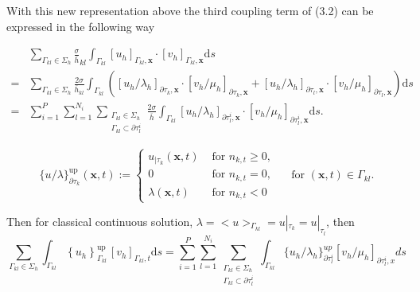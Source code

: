     With this new representation above the third coupling term of (3.2) can be expressed in the following way
    
$$\begin{aligned}
&\sum_{\Gamma_{k l} \in \Sigma_{h}} \frac{\sigma}{\bar{h}}_{k l} \int_{\Gamma_{k l}}\left[u_{h}\right]_{\Gamma_{k l}, \boldsymbol{x}} \cdot\left[v_{h}\right]_{\Gamma_{k l}, \boldsymbol{x}} \mathrm{d} s \\
=&\sum_{\Gamma_{k l} \in \Sigma_{h}} \frac{2 \sigma}{\bar{h}_{k l}} \int_{\Gamma_{k l}}\left( {\left[u_{h} / \lambda_{h}\right]_{\partial \tau_{k}, \boldsymbol{x}} \cdot\left[v_{h} / \mu_{h}\right]_{\partial \tau_{k}, \boldsymbol{x}} }+\left[u_{h} / \lambda_{h}\right]_{\partial \tau_{l}, \boldsymbol{x}} \cdot\left[v_{h} / \mu_{h}\right]_{\partial \tau_{l}, \boldsymbol{x}}\right) \mathrm{d} s \\
=&\sum_{i=1}^{P} \sum_{l=1}^{N_{i}} \sum_{\substack{\Gamma_{k l} \in \Sigma_{h} \\
\Gamma_{k l} \subset \partial \tau_{l}^{i}}} \frac{2 \sigma}{\overline{h}} \int_{\Gamma_{k l}}\left[u_{h} / \lambda_{h}\right]_{\partial \tau_{l}^{i}, \boldsymbol{x}} \cdot\left[v_{h} / \mu_{h}\right]_{\partial \tau_{l}^{i}, \boldsymbol{x}} \mathrm{d} s .
\end{aligned}$$

\begin{definition}
    $$\{u / \lambda\}_{\partial \tau_{k}}^{\operatorname{up}}(\boldsymbol{x}, t):=\left\{\begin{array}{ll}
        u_{\mid \tau_{k}}(\boldsymbol{x}, t) & \text { for } n_{k, t} \geq 0, \\
        0 & \text { for } n_{k, t}=0, \\
        \lambda(\boldsymbol{x}, t) & \text { for } n_{k, t}<0
        \end{array} \quad \text { for }(\boldsymbol{x}, t) \in \Gamma_{k l} .\right.$$
\end{definition}

Then for classical continuous solution, $\lambda=<u>_{\Gamma_{kl}}=u|_{\tau_k}=u|_{\tau_l}$, then 
$$\sum_{\Gamma_{k l} \in \Sigma_{h}} \int_{\Gamma_{k l}}\left\{u_{h}\right\}_{\Gamma_{k l}}^{\text {up }}\left[v_{h}\right]_{\Gamma_{k l}, t} \mathrm{d} s=\sum_{i=1}^{P} \sum_{l=1}^{N_{i}} \sum_{\substack{\Gamma_{k l} \in \Sigma_{h} \\
\Gamma_{k l} \subset \partial \tau_{l}^{i}}}\int_{\Gamma_{kl}}\{u_h/\lambda_h\}_{\partial \tau_l^i}^{up}[v_h/\mu_h]_{\partial \tau_l^i,x}ds$$

